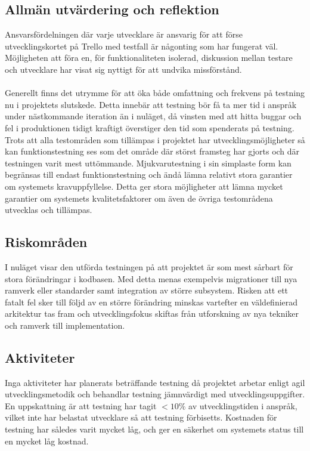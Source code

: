 \subsection{Allmän utvärdering och reflektion}
Ansvarsfördelningen där varje utvecklare är ansvarig för att förse utvecklingskortet på Trello med testfall är någonting som har fungerat väl. Möjligheten att föra en, för funktionaliteten isolerad, diskussion mellan testare och utvecklare har visat sig nyttigt för att undvika missförstånd. \\
\\
Generellt finns det utrymme för att öka både omfattning och frekvens på testning nu i projektets slutskede. Detta innebär att testning bör få ta mer tid i anspråk under nästkommande iteration än i nuläget, då vinsten med att hitta buggar och fel i produktionen tidigt kraftigt överstiger den tid som spenderats på testning. 
\\
Trots att alla testområden som tillämpas i projektet har utvecklingsmöjligheter så kan funktionstestning ses som det område där störst framsteg har gjorts och där testningen varit mest uttömmande. Mjukvarutestning i sin simplaste form kan begränsas till endast funktionstestning och ändå lämna relativt stora garantier om systemets kravuppfyllelse. Detta ger stora möjligheter att lämna mycket garantier om systemets kvalitetsfaktorer om även de övriga testområdena utvecklas och tillämpas. 
\subsection{Riskområden}
I nuläget visar den utförda testningen på att projektet är som mest sårbart för stora förändringar i kodbasen. Med detta menas exempelvis migrationer till nya ramverk eller standarder samt integration av större subsystem. Risken att ett fatalt fel sker till följd av en större förändring minskas vartefter en väldefinierad arkitektur tas fram och utvecklingsfokus skiftas från utforskning av nya tekniker och ramverk till implementation. 
\subsection{Aktiviteter}
Inga aktiviteter har planerats beträffande testning då projektet arbetar enligt agil utvecklingsmetodik och behandlar testning jämnvärdigt med utvecklingsuppgifter. En uppskattning är att testning har tagit $<10\%$ av utvecklingstiden i anspråk, vilket inte har belastat utvecklare så att testning förbisetts. Kostnaden för testning har således varit mycket låg, och ger en säkerhet om systemets status till en mycket låg kostnad.  